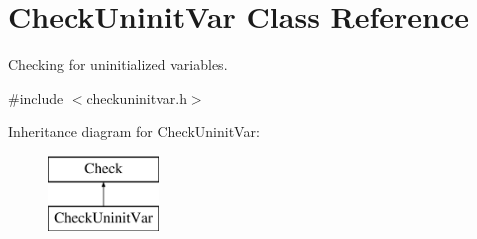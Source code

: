 \hypertarget{class_check_uninit_var}{\section{Check\-Uninit\-Var Class Reference}
\label{class_check_uninit_var}
}


Checking for uninitialized variables.  




{\ttfamily \#include $<$checkuninitvar.\-h$>$}

Inheritance diagram for Check\-Uninit\-Var\-:\begin{figure}[H]
\begin{center}
\leavevmode
\includegraphics[height=2.000000cm]{class_check_uninit_var}
\end{center}
\end{figure}
